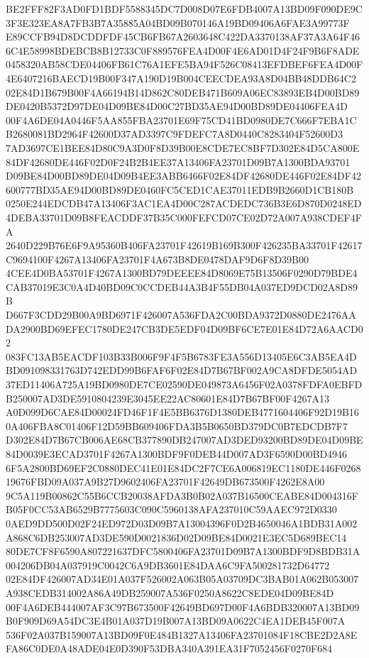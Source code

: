 \documentclass[UTF8,fontset=fandol,zihao=-4,a4paper]{ctexart}
\begin{document}
{{BE2FFF82F3AD0FD1BDF5588345DC7D008D07E6FDB4007A13BD09F090DE9C3F3E323EA8A7FB3B7A35885A04BD09B070146A19BD09406A6FAE3A99773F
E89CCFB94D8DCDDFDF45CB6FB67A2603648C422DA3370138AF37A3A64F466C4E58998BDEBCB8B12733C0F889576FEA4D00F4E6AD01D4F24F9B6F8ADE
0458320AB58CDE04406FB61C76A1EFE5BA94F526C08413EFDBEF6FEA4D00F4E6407216BAECD19B00F347A190D19B004CEECDEA93A8D04BB48DDB64C2
02E84D1B679B00F4A66194B14D862C80DEB471B609A06EC83893EB4D00BD89DE0420B5372D97DE04D09BE84D00C27BD35AE94D00BD89DE04406FEA4D
00F4A6DE04A0446F5AA855FBA23701E69F75CD41BD0980DE7C666F7EBA1CB2680081BD2964F42600D37AD3397C9FDEFC7A8D0440C8283404F52600D3
7AD3697CE1BEE84D80C9A3D0F8D39B00E8CDE7EC8BF7D302E84D5CA800E84DF42680DE446F02D0F24B2B4EE37A13406FA23701D09B7A1300BDA93701
D09BE84D00BD89DE04D09B4EE3ABB6466F02E84DF42680DE446F02E84DF42600777BD35AE94D00BD89DE0460FC5CED1CAE37011EDB9B2660D1CB180B
0250E244EDCDB47A13406F3AC1EA4D00C287ACDEDC736B3E6D870D0248ED4DEBA33701D09B8FEACDDF37B35C000FEFCD07CE02D72A007A938CDEF4FA
2640D229B76E6F9A95360B406FA23701F42619B169B300F426235BA33701F42617C9694100F4267A13406FA23701F4A673B8DE0478DAF9D6F8D39B00
4CEE4D0BA53701F4267A1300BD79DEEEE84D8069E75B13506F0290D79BDE4CAB37019E3C0A4D40BD09C0CCDEB44A3B4F55DB04A037ED9DCD02A8D89B
D667F3CDD29B00A9BD6971F426007A536FDA2C00BDA9372D0880DE2476AADA2900BD69EFEC1780DE247CB3DE5EDF04D09BF6CE7E01E84D72A6AACD02
083FC13AB5EACDF103B33B006F9F4F5B6783FE3A556D13405E6C3AB5EA4DBD091098331763D742EDD99B6FAF6F02E84D7B67BF002A9CA8DFDE5054AD
37ED11406A725A19BD0980DE7CE02590DE049873A6456F02A0378FDFA0EBFDB250007AD3DE5910804239E3045EE22AC80601E84D7B67BF00F4267A13
A0D099D6CAE84D00024FD46F1F4E5BB6376D1380DEB4771604406F92D19B160A406FBA8C01406F12D59BB609406FDA3B5B0650BD379DC0B7EDCDB7F7
D302E84D7B67CB006AE68CB377890DB247007AD3DED93200BD89DE04D09BE84D0039E3ECAD3701F4267A1300BDF9F0DEB44D007AD3F6590D00BD4946
6F5A2800BD69EF2C0880DEC41E01E84DC2F7CE6A006819EC1180DE446F026819676FBD09A037A9B27D9602406FA23701F42649DB673500F4262E8A00
9C5A119B00862C55B6CCB20038AFDA3B0B02A037B16500CEABE84D004316FB05F0CC53AB6529B7775603C090C5960138AFA237010C59AAEC972D0330
0AED9DD500D02F24ED972D03D09B7A13004396F0D2B4650046A1BDB31A002A868C6DB253007AD3DE590D0021836D02D09BE84D0021E3EC5D689BEC14
80DE7CF8F6590A807221637DFC5800406FA23701D09B7A1300BDF9D8BDB31A004206DB04A037919C0042C6A9DB3601E84DAA6C9FA500281732D64772
02E84DF426007AD34E01A037F526002A063B05A03709DC3BAB01A062B053007A938CEDB314002A86A49DB259007A536F0250A8622C8EDE04D09BE84D
00F4A6DEB444007AF3C97B673500F42649BD697D00F4A6BDB320007A13BD09B0F909D69A54DC3E4B01A037D19B007A13BD09A0622C4EA1DEB45F007A
536F02A037B159007A13BD09F0E484B1327A13406FA23701084F18CBE2D2A8EFA86C0DE0A48ADE04E0D390F53DBA340A391EA31F7052456F0270F684
}}
\end{document}
